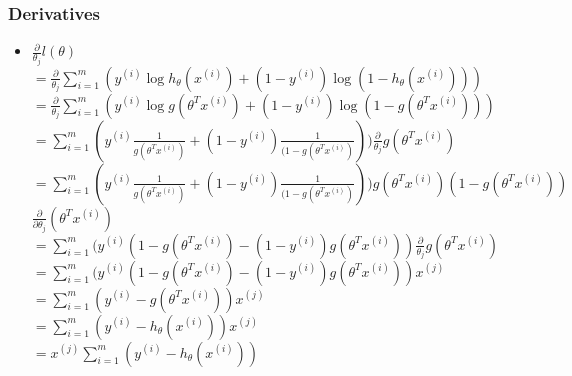 \begin{frame}
\frametitle{Derivatives}
	\small
	\begin{itemize}
		\item $\frac{\partial}{\theta_j}l(\theta)$\\
			\hspace{0.8cm} $=\frac{\partial}{\theta_j}\sum_{i=1}^{m}(y^{(i)}\log h_{\theta}(x^{(i)})+{(1-y^{(i)})}\log (1-h_{\theta}(x^{(i)})))$\\
			\hspace{0.8cm} $=\frac{\partial}{\theta_j}\sum_{i=1}^{m}(y^{(i)}\log g(\theta ^T x^{(i)})+{(1-y^{(i)})}\log (1-g(\theta ^T x^{(i)})))$\\
			\hspace{0.8cm} $=\sum_{i=1}^{m}(y^{(i)}\frac{1}{g(\theta ^T x^{(i)})}+{(1-y^{(i)})}\frac{1}{(1-g(\theta ^T x^{(i)})}))\frac{\partial}{\theta_j}g(\theta ^T x^{(i)})$\\
			\hspace{0.8cm} $=\sum_{i=1}^{m}(y^{(i)}\frac{1}{g(\theta ^T x^{(i)})}+{(1-y^{(i)})}\frac{1}{(1-g(\theta ^T x^{(i)})}))
			g(\theta ^T x^{(i)})(1-g(\theta ^T x^{(i)}))$\\
			\hspace{9.5cm}$\frac{\partial}{\partial{\theta_j}}(\theta ^T x^{(i)})$\\
			\hspace{0.8cm} $=\sum_{i=1}^{m}(y^{(i)}(1-g(\theta ^T x^{(i)})-(1-y^{(i)})g(\theta ^T x^{(i)}))\frac{\partial}{\theta_j}g(\theta ^T x^{(i)})$\\
			\hspace{0.8cm} $=\sum_{i=1}^{m}(y^{(i)}(1-g(\theta ^T x^{(i)})-(1-y^{(i)})g(\theta ^T x^{(i)})) x^{(j)}$\\
			\hspace{0.8cm} $=\sum_{i=1}^{m}(y^{(i)}-g(\theta ^T x^{(i)})) x^{(j)}$\\
			\hspace{0.8cm} $=\sum_{i=1}^{m}(y^{(i)}-h_{\theta}(x^{(i)})) x^{(j)}$\\
			\hspace{0.8cm} $=x^{(j)}\sum_{i=1}^{m}(y^{(i)}-h_{\theta}(x^{(i)}))$\\

	\end{itemize}
\end{frame}
\ifx\allfiles\undefined

\fi

